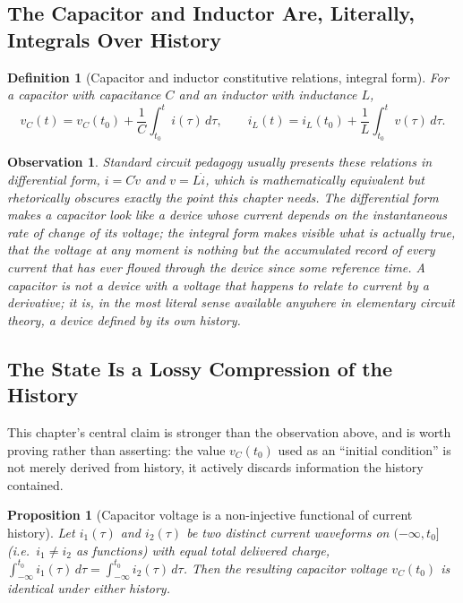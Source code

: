 \documentclass[12pt]{article}
\newtheorem{definition}{Definition}
\newtheorem{proposition}{Proposition}
\newtheorem{observation}{Observation}
\begin{document}
\subsection*{The Capacitor and Inductor Are, Literally, Integrals Over History}

\begin{definition}[Capacitor and inductor constitutive relations, integral form]
For a capacitor with capacitance $C$ and an inductor with inductance $L$,
\[
v_C(t) = v_C(t_0) + \frac{1}{C}\int_{t_0}^{t} i(\tau)\,d\tau, \qquad i_L(t) = i_L(t_0) + \frac{1}{L}\int_{t_0}^{t} v(\tau)\,d\tau.
\]
\end{definition}

\begin{observation}
Standard circuit pedagogy usually presents these relations in differential form, $i = C\dot v$ and $v = L \dot i$, which is mathematically equivalent but rhetorically obscures exactly the point this chapter needs. The differential form makes a capacitor look like a device whose current depends on the instantaneous rate of change of its voltage; the integral form makes visible what is actually true, that the voltage at any moment is nothing but the accumulated record of every current that has ever flowed through the device since some reference time. A capacitor is not a device with a voltage that happens to relate to current by a derivative; it is, in the most literal sense available anywhere in elementary circuit theory, a device defined by its own history.
\end{observation}

\subsection*{The State Is a Lossy Compression of the History}

This chapter's central claim is stronger than the observation above, and is worth proving rather than asserting: the value $v_C(t_0)$ used as an ``initial condition'' is not merely derived from history, it actively discards information the history contained.

\begin{proposition}[Capacitor voltage is a non-injective functional of current history]
Let $i_1(\tau)$ and $i_2(\tau)$ be two distinct current waveforms on $(-\infty, t_0]$ (i.e.\ $i_1 \neq i_2$ as functions) with equal total delivered charge, $\int_{-\infty}^{t_0} i_1(\tau)\,d\tau = \int_{-\infty}^{t_0} i_2(\tau)\,d\tau$. Then the resulting capacitor voltage $v_C(t_0)$ is identical under either history.
\end{proposition}
\end{document}
